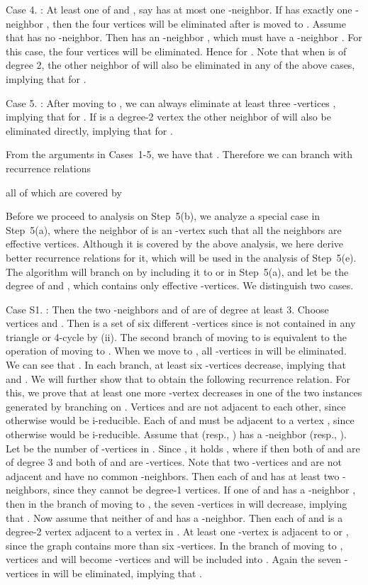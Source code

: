 \documentclass{elsart_TR2}
\begin{document}
Case 4.  : At least one of  and , say  has at most  one -neighbor.
If  has exactly one -neighbor ,
then  the four vertices  will be eliminated after  is moved to .
Assume that  has no -neighbor.
Then   has an -neighbor , which  must have
 a -neighbor .
For this case, the four vertices  will be eliminated.
Hence
 for .
Note that when  is of degree 2,
the other neighbor  of  will also be eliminated in any of the above cases,
 implying that  for .

Case 5. : After moving  to , we can always eliminate at least three -vertices ,
 implying that  for .
If  is a degree-2 vertex the other neighbor  of  will also be eliminated directly,
 implying that  for .

\medskip
From the arguments in Cases~1-5, we have that .
Therefore we can branch with recurrence relations

all of which are covered by
\medskip

Before we proceed to analysis on Step~5(b),
we analyze a special case in Step~5(a), where the neighbor  of 
 is an -vertex such that all the neighbors are effective vertices.
Although it is covered by the above analysis, we here derive better
recurrence relations for it, which will be used in the analysis of Step~5(e).
The algorithm will branch on  by including it to  or  in Step~5(a),
and let  be the degree of  and , which contains only effective -vertices.
We distinguish two cases.

Case S1. :
 Then the two -neighbors  and  of  are  of degree at least 3.
Choose vertices  and .
Then  is a set of six different -vertices since  is not contained in any triangle or 4-cycle by (ii).
The second branch of moving  to  is equivalent to the operation of moving  to .
When we move   to , all -vertices in  will be eliminated.
We can see that . In each branch, at least six -vertices decrease,
implying that  and .
We will further show that 
to obtain  the following   recurrence relation.
For this, we prove that
at least one more -vertex decreases in one of the two instances generated by branching on .
Vertices  and  are not adjacent to each other, since otherwise  would be i-reducible.
Each of  and  must be adjacent to a vertex , since otherwise
 would be i-reducible.
Assume that  (resp., )  has a  -neighbor  (resp.,  ).
Let  be the number of -vertices in  .
Since   , it holds ,
where if  then both of  and  are of degree 3
and both of  and  are -vertices.
Note that two -vertices  and  are not adjacent and have no common -neighbors.
Then each of  and  has at least two -neighbors, since they cannot be degree-1 vertices.
If one of  and   has a -neighbor , then in the branch of moving  to ,
the seven -vertices in  will decrease, implying that .
Now assume that  neither of  and  has a -neighbor.
Then
each of  and  is a degree-2 vertex adjacent to a vertex in .
At least one -vertex  is adjacent to  or ,
since the graph contains more than six -vertices.
In the branch of moving  to , vertices  and  will become -vertices
and  will be included into .
Again
the seven -vertices in  will be eliminated, implying that .
\end{document}
